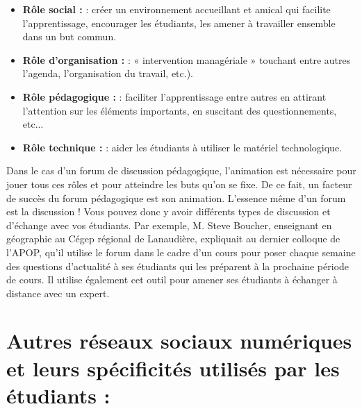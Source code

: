 \documentclass[12pt,a4paper,titlepage]{article}
\begin{document}
\begin{itemize}
    \item \textbf{Rôle social : } : créer un environnement accueillant et amical qui facilite
l'apprentissage, encourager les étudiants, les amener à travailler ensemble dans un but
commun.

    \item \textbf{Rôle d'organisation :} : « intervention managériale » touchant entre autres
l'agenda, l'organisation du travail, etc.).
    \item \textbf{Rôle pédagogique :} : faciliter l'apprentissage entre autres en attirant l'attention sur
les éléments importants, en suscitant des questionnements, etc...
    \item \textbf{Rôle technique :} : aider les étudiants à utiliser le matériel technologique. 
\end{itemize}

Dans le cas d'un forum de discussion pédagogique, l'animation est nécessaire pour jouer tous
ces rôles et pour atteindre les buts qu'on se fixe. De ce fait, un facteur de succès du forum
pédagogique est son animation.\newline
L'essence même d'un forum est la discussion ! Vous pouvez donc y avoir différents types de
discussion et d'échange avec vos étudiants. Par exemple, M. Steve Boucher, enseignant en
géographie au Cégep régional de Lanaudière, expliquait au dernier colloque de l'APOP, qu'il
utilise le forum dans le cadre d'un cours pour poser chaque semaine des questions d'actualité à
ses étudiants qui les préparent à la prochaine période de cours. Il utilise également cet outil pour
amener ses étudiants à échanger à distance avec un expert.\newline
\section{Autres réseaux sociaux numériques et leurs spécificités utilisés par les étudiants : }
\end{document}
